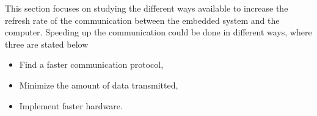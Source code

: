 









This section focuses on studying the different ways available to increase the refresh rate of the communication between the embedded system and the computer. Speeding up the communication could be done in different ways, where three are stated below

\begin{itemize}
	\item Find a faster communication protocol,
	\item Minimize the amount of data transmitted,
	\item Implement faster hardware.	
\end{itemize}

